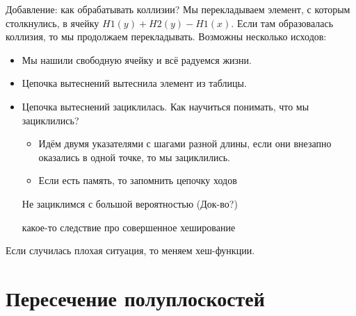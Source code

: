 Добавление: как обрабатывать коллизии? Мы перекладываем элемент, с которым столкнулись, в ячейку $H1(y) + H2(y) - H1(x)$.
Если там образовалась коллизия, то мы продолжаем перекладывать. Возможны несколько исходов:
\begin{itemize}
    \item Мы нашили свободную ячейку и всё радуемся жизни.
    \item Цепочка вытеснений вытеснила элемент из таблицы.
    \item Цепочка вытеснений зациклилась. Как научиться понимать, что мы зациклились?
        \begin{itemize}
            \item Идём двумя указателями с шагами разной длины, если они внезапно оказались в одной точке, то мы зациклились.
            \item Если есть память, то запомнить цепочку ходов
        \end{itemize}
        Не зациклимся с большой вероятностью (Док-во?)
        
        какое-то следствие про совершенное хеширование
\end{itemize}

Если случилась плохая ситуация, то меняем хеш-функции.


\section{Пересечение полуплоскостей}



















